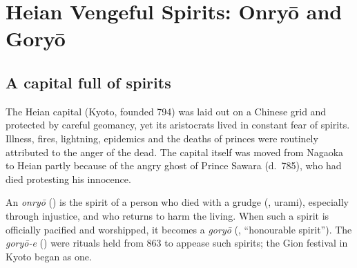 \chapter{Heian Vengeful Spirits: Onryō and Goryō}

\section{A capital full of spirits}

The Heian capital (Kyoto, founded 794) was laid out on a Chinese grid and protected by
careful geomancy, yet its aristocrats lived in constant fear of spirits. Illness, fires,
lightning, epidemics and the deaths of princes were routinely attributed to the anger of the
dead. The capital itself was moved from Nagaoka to Heian partly because of the angry ghost
of Prince Sawara (d.\ 785), who had died protesting his innocence.

\begin{definition}
An \emph{onryō} () is the spirit of a person who died with a grudge (,
urami), especially through injustice, and who returns to harm the living. When such a
spirit is officially pacified and worshipped, it becomes a \emph{goryō} (,
``honourable spirit''). The \emph{goryō-e} () were rituals held from 863 to
appease such spirits; the Gion festival in Kyoto began as one.
\end{definition}

\begin{center}
\end{center}

